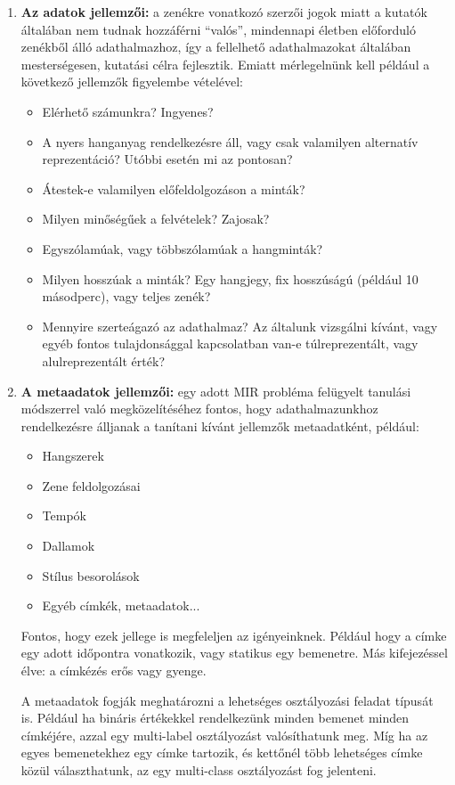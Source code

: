 \begin{enumerate}
 \item \textbf{Az adatok jellemzői:} a zenékre vonatkozó szerzői jogok miatt a kutatók általában nem tudnak hozzáférni “valós”, mindennapi életben előforduló zenékből álló adathalmazhoz, így a fellelhető adathalmazokat általában mesterségesen, kutatási célra fejlesztik. Emiatt mérlegelnünk kell például a következő jellemzők figyelembe vételével:
	 \begin{itemize}
	  \item Elérhető számunkra? Ingyenes?
	  \item A nyers hanganyag rendelkezésre áll, vagy csak valamilyen alternatív reprezentáció?  Utóbbi esetén mi az pontosan?
	  \item Átestek-e valamilyen előfeldolgozáson a minták? 
	  \item Milyen minőségűek a felvételek? Zajosak?
	  \item Egyszólamúak, vagy többszólamúak a hangminták?
	  \item Milyen hosszúak a minták? Egy hangjegy, fix hosszúságú (például 10 másodperc), vagy teljes zenék?
	  \item Mennyire szerteágazó az adathalmaz? Az általunk vizsgálni kívánt, vagy egyéb fontos tulajdonsággal kapcsolatban van-e túlreprezentált, vagy alulreprezentált érték?
	 \end{itemize}
 \item \textbf{A metaadatok jellemzői:} egy adott MIR probléma felügyelt tanulási módszerrel való megközelítéséhez fontos, hogy adathalmazunkhoz rendelkezésre álljanak a tanítani kívánt jellemzők metaadatként, például:
	 \begin{itemize}
	  \item Hangszerek
	  \item Zene feldolgozásai
	  \item Tempók
	  \item Dallamok
	  \item Stílus besorolások
	  \item Egyéb címkék, metaadatok...
	 \end{itemize}
	 Fontos, hogy ezek jellege is megfeleljen az igényeinknek. Például hogy a címke egy adott időpontra vonatkozik, vagy statikus egy bemenetre. Más kifejezéssel élve: a címkézés erős vagy gyenge.
	 
	 A metaadatok fogják meghatározni a lehetséges osztályozási feladat típusát is. Például ha bináris értékekkel rendelkezünk minden bemenet minden címkéjére, azzal egy multi-label osztályozást valósíthatunk meg. Míg ha az egyes bemenetekhez egy címke tartozik, és kettőnél több lehetséges címke közül választhatunk, az egy multi-class osztályozást fog jelenteni.
\end{enumerate}

